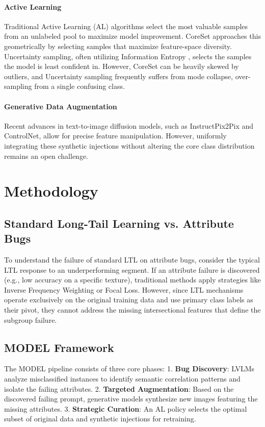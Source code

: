 \documentclass{article}
\newcommand{\model}{MODEL\xspace}
\newcommand{\controlnet}{ControlNet\xspace}
\begin{document}
\paragraph{Active Learning}
Traditional Active Learning (AL) algorithms select the most valuable samples from an unlabeled pool to maximize model improvement. CoreSet \citep{sener2018active} approaches this geometrically by selecting samples that maximize feature-space diversity. Uncertainty sampling, often utilizing Information Entropy \citep{shannon1948mathematical}, selects the samples the model is least confident in. However, CoreSet can be heavily skewed by outliers, and Uncertainty sampling frequently suffers from mode collapse, over-sampling from a single confusing class.

\paragraph{Generative Data Augmentation}
Recent advances in text-to-image diffusion models, such as InstructPix2Pix \citep{brooks2023instructpix2pix} and \controlnet \citep{zhang2023adding}, allow for precise feature manipulation. However, uniformly integrating these synthetic injections without altering the core class distribution remains an open challenge.

\section{Methodology}

\subsection{Standard Long-Tail Learning vs. Attribute Bugs}
To understand the failure of standard LTL on attribute bugs, consider the typical LTL response to an underperforming segment. If an attribute failure is discovered (e.g., low accuracy on a specific texture), traditional methods apply strategies like Inverse Frequency Weighting or Focal Loss. However, since LTL mechanisms operate exclusively on the original training data and use primary class labels as their pivot, they cannot address the missing intersectional features that define the subgroup failure. 

\subsection{\model Framework}
The \model pipeline consists of three core phases:
1. \textbf{Bug Discovery}: LVLMs analyze misclassified instances to identify semantic correlation patterns and isolate the failing attributes.
2. \textbf{Targeted Augmentation}: Based on the discovered failing prompt, generative models synthesize new images featuring the missing attributes.
3. \textbf{Strategic Curation}: An AL policy selects the optimal subset of original data and synthetic injections for retraining.
\end{document}
